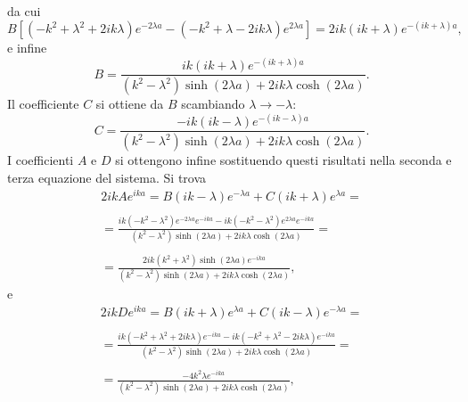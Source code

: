 da cui
\begin{equation}
B\left[ (-k^2+\lambda ^2+2ik\lambda) e^{-2\lambda a }-(-k^2+\lambda-2ik\lambda) e^{2\lambda a }\right]= 2ik(ik+\lambda) e^{-\left(ik+\lambda\right) a },
\end{equation}
e infine
\begin{equation}
B=\frac{ik\left(ik+\lambda \right)e^{-\left(ik+\lambda\right) a }}{\left(k^2-\lambda^2\right)\sinh \left(2\lambda a\right)+2ik\lambda \cosh\left(2\lambda a\right)}.
\end{equation}
Il coefficiente $C$ si ottiene da $B$ scambiando $\lambda \rightarrow -\lambda$:
\begin{equation}
C=\frac{-ik\left(ik-\lambda \right)e^{-\left(ik-\lambda\right) a }}{\left(k^2-\lambda^2\right)\sinh \left(2\lambda a\right)+2ik\lambda \cosh\left(2\lambda a\right)}.
\end{equation}
I coefficienti $A$ e $D$ si ottengono infine sostituendo questi risultati nella seconda e terza equazione del sistema. Si trova
\begin{eqnarray}
& 2ikAe^{ika}= B \left(ik-\lambda\right)e^{-\lambda a} +C \left(ik+\lambda\right)e^{\lambda a}=&\nonumber \\
\nonumber\\
& = \displaystyle{\frac{ik\left(-k^2-\lambda ^2 \right)e^{-2\lambda a }e^{-ika }-ik\left(-k^2-\lambda ^2 \right)e^{2\lambda a }e^{-ika }}{\left(k^2-\lambda^2\right)\sinh \left(2\lambda a\right)+2ik\lambda \cosh\left(2\lambda a\right)}=} &\nonumber \\
\nonumber \\
&\displaystyle{ =\frac{2ik\left(k^2+\lambda ^2 \right)\sinh\left(2\lambda a\right)e^{-ika}}{\left(k^2-\lambda^2\right)\sinh \left(2\lambda a\right)+2ik\lambda \cosh\left(2\lambda a\right)}},&
\end{eqnarray}
e
\begin{eqnarray}
&2ikD e^{ika} = B\left(ik+\lambda\right)e^{\lambda a} + C\left(ik-\lambda\right)e^{-\lambda a} = &\nonumber \\
\nonumber\\
& = \displaystyle{\frac{ik\left(-k^2 + \lambda ^2 +2ik\lambda\right)e^{-ika}-ik\left(-k^2 + \lambda ^2 -2ik\lambda\right)e^{-ika}}{\left(k^2-\lambda^2\right)\sinh \left(2\lambda a\right)+2ik\lambda \cosh\left(2\lambda a\right)}=} &\nonumber \\
\nonumber \\
&\displaystyle{ =\frac{-4k^2\lambda e^{-ika}}{\left(k^2-\lambda^2\right)\sinh \left(2\lambda a\right)+2ik\lambda \cosh\left(2\lambda a\right)}},&
\end{eqnarray}
